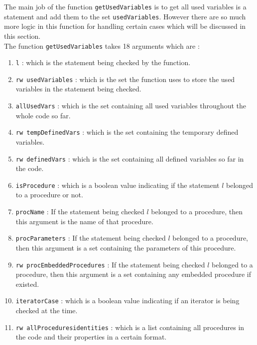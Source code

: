 \documentclass[11pt]{report}
\begin{document}
The main job of the function \texttt{getUsedVariables} is to get all used variables is a statement and add them to the set \texttt{usedVariables}. However there are so much more logic in this function for handling certain cases which will be discussed in this section.
\\

The function \texttt{getUsedVariables} takes 18 arguments which are :

\begin{enumerate}
\item \texttt{l} : which is the statement being checked by the function.

\item \texttt{rw usedVariables} : which is the set the function uses to store the used variables in the statement being checked.

\item \texttt{allUsedVars} : which is the set containing all used variables throughout the whole code so far.

\item \texttt{rw tempDefinedVars} : which is the set containing the temporary defined variables.

\item \texttt{rw definedVars} : which is the set containing all defined variables so far in the code.

\item \texttt{isProcedure} : which is a boolean value indicating if the statement $l$ belonged to a procedure or not.

\item \texttt{procName} : If the statement being checked $l$ belonged to a procedure, then this argument is the name of that procedure.

\item \texttt{procParameters} : If the statement being checked $l$ belonged to a procedure, then this argument is a set containing the parameters of this procedure.

\item \texttt{rw procEmbeddedProcedures} : If the statement being checked $l$ belonged to a procedure, then this argument is a set containing any embedded procedure if existed.

\item \texttt{iteratorCase} : which is a boolean value indicating if an iterator is being checked at the time.

\item \texttt{rw allProceduresidentities} : which is a list containing all procedures in the code and their properties in a certain format.


\end{enumerate}
\end{document}
